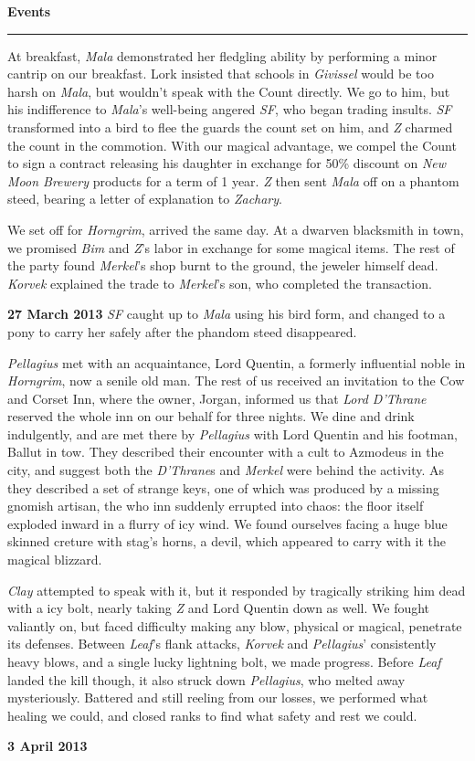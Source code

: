 \documentclass[letterpaper]{article}
\newcommand{\e}[1]{\emph{#1}}
\newcommand{\B}[1]{\textbf{#1}}
\newenvironment{notesection}[1]
{ {\huge \B{#1}}\hrule\vspace{0.5em}\begingroup\fontsize{9pt}{12pt}\selectfont}
{\endgroup}
\begin{document}
\begin{notesection}{Events}
At breakfast, \e{Mala} demonstrated her fledgling ability by performing a minor cantrip on our breakfast. Lork insisted that schools in \e{Givissel} would be too harsh on \e{Mala}, but wouldn't speak with the Count directly. We go to him, but his indifference to \e{Mala}'s well-being angered \e{SF}, who began trading insults. \e{SF} transformed into a bird to flee the guards the count set on him, and \e{Z} charmed the count in the commotion. With our magical advantage, we compel the Count to sign a contract releasing his daughter in exchange for 50\% discount on \e{New Moon Brewery} products for a term of 1 year. \e{Z} then sent \e{Mala} off on a phantom steed, bearing a letter of explanation to \e{Zachary}.

We set off for \e{Horngrim}, arrived the same day. At a dwarven blacksmith in town, we promised \e{Bim} and \e{Z}'s labor in exchange for some magical items.  The rest of the party found \e{Merkel}'s shop burnt to the ground, the jeweler himself dead. \e{Korvek} explained the trade to \e{Merkel}'s son, who completed the transaction.

\B{27 March 2013} \e{SF} caught up to \e{Mala} using his bird form, and changed to a pony to carry her safely after the phandom steed disappeared. 

\e{Pellagius} met with an acquaintance, Lord Quentin, a formerly influential noble in \e{Horngrim}, now a senile old man. The rest of us received an invitation to the Cow and Corset Inn, where the owner, Jorgan, informed us that \e{Lord D'Thrane} reserved the whole inn on our behalf for three nights. We dine and drink indulgently, and are met there by \e{Pellagius} with Lord Quentin and his footman, Ballut in tow. They described their encounter with a cult to Azmodeus in the city, and suggest both the \e{D'Thrane}s and \e{Merkel} were behind the activity. As they described a set of strange keys, one of which was produced by a missing gnomish artisan, the who inn suddenly errupted into chaos: the floor itself exploded inward in a flurry of icy wind. We found ourselves facing a huge blue skinned creture with stag's horns, a devil, which appeared to carry with it the magical blizzard. 

\e{Clay} attempted to speak with it, but it responded by tragically striking him dead with a icy bolt, nearly taking \e{Z} and Lord Quentin down as well.  We fought valiantly on, but faced difficulty making any blow, physical or magical, penetrate its defenses. Between \e{Leaf}'s flank attacks, \e{Korvek} and \e{Pellagius}' consistently heavy blows, and a single lucky lightning bolt, we made progress. Before \e{Leaf} landed the kill though, it also struck down \e{Pellagius}, who melted away mysteriously. Battered and still reeling from our losses, we performed what healing we could, and closed ranks to find what safety and rest we could.

\B{3 April 2013}

\end{notesection}
\end{document}
